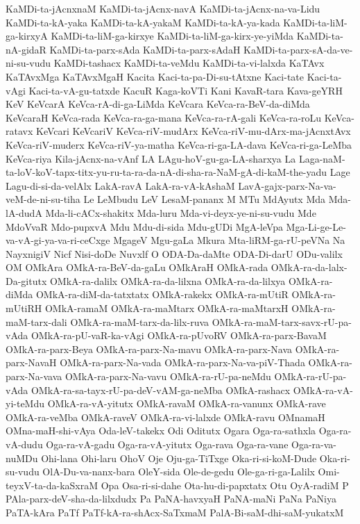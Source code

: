 {KaMDi-ta-jAcnxnaM
KaMDi-ta-jAcnx-navA
KaMDi-ta-jAcnx-na-va-Lidu
KaMDi-ta-kA-yaka
KaMDi-ta-kA-yakaM
KaMDi-ta-kA-ya-kada
KaMDi-ta-liM-ga-kirxyA
KaMDi-ta-liM-ga-kirxye
KaMDi-ta-liM-ga-kirx-ye-yiMda
KaMDi-ta-nA-gidaR
KaMDi-ta-parx-sAda
KaMDi-ta-parx-sAdaH
KaMDi-ta-parx-sA-da-ve-ni-su-vudu
KaMDi-tashacx
KaMDi-ta-veMdu
KaMDi-ta-vi-lalxda
KaTAvx
KaTAvxMga
KaTAvxMgaH
Kacita
Kaci-ta-pa-Di-su-tAtxne
Kaci-tate
Kaci-ta-vAgi
Kaci-ta-vA-gu-tatxde
KacuR
Kaga-koVTi
Kani
KavaR-tara
Kava-geYRH
KeV
KeVcarA
KeVca-rA-di-ga-LiMda
KeVcara
KeVca-ra-BeV-da-diMda
KeVcaraH
KeVca-rada
KeVca-ra-ga-mana
KeVca-ra-rA-gali
KeVca-ra-roLu
KeVca-ratavx
KeVcari
KeVcariV
KeVca-riV-mudArx
KeVca-riV-mu-dArx-ma-jAcnxtAvx
KeVca-riV-muderx
KeVca-riV-ya-matha
KeVca-ri-ga-LA-dava
KeVca-ri-ga-LeMba
KeVca-riya
Kila-jAcnx-na-vAnf
LA
LAgu-hoV-gu-ga-LA-sharxya
La
Laga-naM-ta-loV-koV-tapx-titx-yu-ru-ta-ra-da-nA-di-sha-ra-NaM-gA-di-kaM-the-yadu
Lage
Lagu-di-si-da-velAlx
LakA-ravA
LakA-ra-vA-kAshaM
LavA-gajx-parx-Na-va-veM-de-ni-su-tiha
Le
LeMbudu
LeV
LesaM-pananx
M
MTu
MdAyutx
Mda
Mda-lA-dudA
Mda-li-cACx-shakitx
Mda-luru
Mda-vi-deyx-ye-ni-su-vudu
Mde
MdoVvaR
Mdo-pupxvA
Mdu
Mdu-di-sida
Mdu-gUDi
MgA-leVpa
Mga-Li-ge-Le-va-vA-gi-ya-va-ri-ceCxge
MgageV
Mgu-gaLa
Mkura
Mta-liRM-ga-rU-peVNa
Na
NayxnigiV
Nicf
Nisi-doDe
Nuvxlf
O
ODA-Da-daMte
ODA-Di-darU
ODu-valilx
OM
OMkAra
OMkA-ra-BeV-da-gaLu
OMkAraH
OMkA-rada
OMkA-ra-da-lalx-Da-gitutx
OMkA-ra-dalilx
OMkA-ra-da-lilxna
OMkA-ra-da-lilxya
OMkA-ra-diMda
OMkA-ra-diM-da-tatxtatx
OMkA-rakekx
OMkA-ra-mUtiR
OMkA-ra-mUtiRH
OMkA-ramaM
OMkA-ra-maMtarx
OMkA-ra-maMtarxH
OMkA-ra-maM-tarx-dali
OMkA-ra-maM-tarx-da-lilx-ruva
OMkA-ra-maM-tarx-savx-rU-pa-vAda
OMkA-ra-pU-vaR-ka-vAgi
OMkA-ra-pUvoRV
OMkA-ra-parx-BavaM
OMkA-ra-parx-Beya
OMkA-ra-parx-Na-mavu
OMkA-ra-parx-Nava
OMkA-ra-parx-NavaH
OMkA-ra-parx-Na-vada
OMkA-ra-parx-Na-va-piV-Thada
OMkA-ra-parx-Na-vava
OMkA-ra-parx-Na-vavu
OMkA-ra-rU-pa-neMdu
OMkA-ra-rU-pa-vAda
OMkA-ra-sa-tayx-rU-pa-deV-vAM-ga-neMba
OMkA-rashacx
OMkA-ra-vA-yi-teMdu
OMkA-ra-vA-yitutx
OMkA-ravaM
OMkA-ra-vanunx
OMkA-rave
OMkA-ra-veMba
OMkA-raveV
OMkA-ra-vi-lalxde
OMkA-ravu
OMnamaH
OMna-maH-shi-vAya
Oda-leV-takekx
Odi
Oditutx
Ogara
Oga-ra-sathxla
Oga-ra-vA-dudu
Oga-ra-vA-gadu
Oga-ra-vA-yitutx
Oga-rava
Oga-ra-vane
Oga-ra-va-nuMDu
Ohi-lana
Ohi-laru
OhoV
Oje
Oju-ga-TiTxge
Oka-ri-si-koM-Dude
Oka-ri-su-vudu
OlA-Du-va-nanx-bara
OleY-sida
Ole-de-gedu
Ole-ga-ri-ga-Lalilx
Omi-teyxV-ta-da-kaSxraM
Opa
Osa-ri-si-dahe
Ota-hu-di-papxtatx
Otu
OyA-radiM
P
PAla-parx-deV-sha-da-lilxdudx
Pa
PaNA-havxyaH
PaNA-maNi
PaNa
PaNiya
PaTA-kAra
PaTf
PaTf-kA-ra-shAcx-SaTxmaM
PalA-Bi-saM-dhi-saM-yukatxM
}
